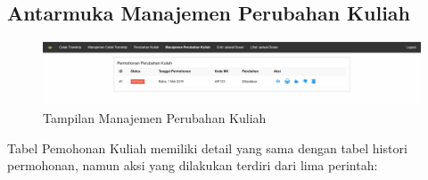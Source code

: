 \documentclass[a4paper,twoside]{article}
\begin{document}
\begin{enumerate}
		\subsection{Antarmuka Manajemen Perubahan Kuliah}
		\begin{figure} [H]
			\centering  
			\includegraphics[scale=0.5]{Tampilan-Manajemen-Perubahan-Kuliah.png}  
			\caption{Tampilan Manajemen Perubahan Kuliah} 
		\end{figure}
		Tabel Pemohonan Kuliah memiliki detail yang sama dengan tabel histori permohonan, namun aksi yang dilakukan terdiri dari lima perintah:
		

\end{enumerate}
\end{document}
